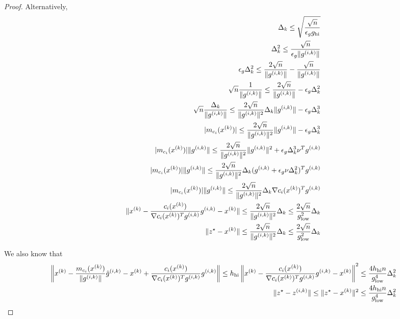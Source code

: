 \begin{proof}
\color{red}





Alternatively,
\begin{align*}
\Delta_k \le \sqrt{\frac{\sqrt{n}}{\epsilon_gg_{\text{hi}}}} \\
\Delta_k^2 \le \frac{\sqrt{n}}{\epsilon_g\|{g^{(i, k)}}\|} \\
\epsilon_g\Delta_k^2 \le \frac{2\sqrt{n}}{\|{g^{(i, k)}}\|} - \frac{\sqrt{n}}{\|{g^{(i, k)}}\|} \\
\sqrt{n}\frac{1}{\|{g^{(i, k)}}\|} \le \frac{2\sqrt{n}}{\|{g^{(i, k)}}\|}  - \epsilon_g\Delta_k^2 \\
\sqrt{n}\frac{\Delta_k}{\|{g^{(i, k)}}\|} \le \frac{2\sqrt{n}}{\|{g^{(i, k)}}\|^2}\Delta_k \|{g^{(i, k)}}\| - \epsilon_g\Delta_k^3 \\
|m_{c_i}({x^{(k)}})| \le \frac{2\sqrt{n}}{\|{g^{(i, k)}}\|^2} \|{g^{(i, k)}}\| - \epsilon_g\Delta_k^3 \\
|m_{c_i}({x^{(k)}})|\|{g^{(i, k)}}\| \le \frac{2\sqrt{n}}{\|{g^{(i, k)}}\|^2} \|{g^{(i, k)}}\|^2 + \epsilon_g\Delta_k^3\nu^T{g^{(i, k)}} \\
|m_{c_i}({x^{(k)}})|\|{g^{(i, k)}}\| \le \frac{2\sqrt{n}}{\|{g^{(i, k)}}\|^2} \Delta_k({g^{(i, k)}} + \epsilon_g\nu\Delta_k^2)^T {g^{(i, k)}}\\
|m_{c_i}({x^{(k)}})|\|{g^{(i, k)}}\| \le \frac{2\sqrt{n}}{\|{g^{(i, k)}}\|^2}\Delta_k \nabla c_i({x^{(k)}}) ^T {g^{(i, k)}}\\
\|{x^{(k)}} - \frac{c_i({x^{(k)}})}{\nabla c_i({x^{(k)}}) ^T {g^{(i, k)}}}{g^{(i, k)}}- {x^{(k)}}\| \le \frac{2\sqrt{n}}{\|{g^{(i, k)}}\|^2}\Delta_k  \le \frac{2\sqrt{n}}{g_{\text{low}}^2}\Delta_k \\
\|z^{\star} - {x^{(k)}}\| \le \frac{2\sqrt{n}}{\|{g^{(i, k)}}\|^2}\Delta_k  \le \frac{2\sqrt{n}}{g_{\text{low}}^2}\Delta_k \\
\end{align*}

We also know that
\begin{align*}
\left\|{x^{(k)}} - \frac{m_{c_i}({x^{(k)}})}{\|{g^{(i, k)}}\|}{{\hat g}^{(i, k)}} - {x^{(k)}} + \frac{c_i({x^{(k)}})}{\nabla c_i({x^{(k)}}) ^T {g^{(i, k)}}}{g^{(i, k)}}\right\| \le h_{\text{hi}}\left\|{x^{(k)}} - \frac{c_i({x^{(k)}})}{\nabla c_i({x^{(k)}}) ^T {g^{(i, k)}}}{g^{(i, k)}}- {x^{(k)}}\right\|^2
\le \frac{4h_{\text{hi}}n}{g_{\text{low}}^4}\Delta_k^2 \\
\|z^{\star} - {z^{(i, k)}}\| \le \|z^{\star} - {x^{(k)}}\|^2 \le \frac{4h_{\text{hi}}n}{g_{\text{low}}^4}\Delta_k^2 \\
\end{align*}



\end{proof}
